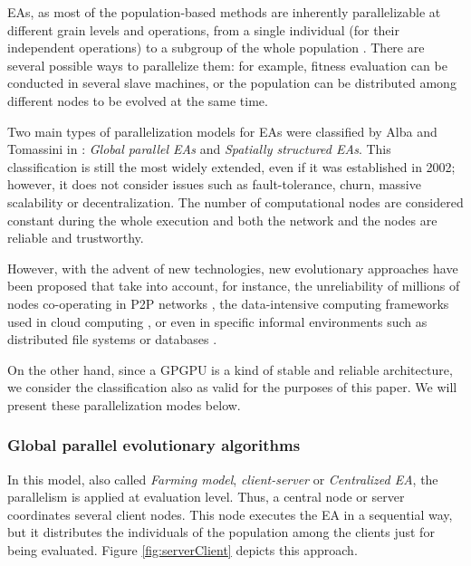 \documentclass{article}
\begin{document}
EAs, as most of the population-based methods are inherently parallelizable at different grain levels and operations, from a single individual (for their independent operations) to a subgroup of the whole population  \cite{Alba13parallel}.
There are several possible ways to parallelize them: for example, fitness evaluation can be conducted in several slave machines, or the population can be distributed among different nodes to be evolved at the same time.

Two main types of parallelization models for EAs were classified by Alba and Tomassini in \cite{Alba02Parallelism}: \textit{Global parallel EAs} and
\textit{Spatially structured EAs}. This classification is still the
most widely extended, even if it was established in 2002; however, it
does not consider issues such as fault-tolerance, churn, massive
scalability or decentralization. The number of computational nodes are
considered constant during the whole execution and both the network
and the nodes are reliable and trustworthy.

However, with the advent of new technologies, new evolutionary approaches have been proposed that take into account, for instance, the unreliability of millions of nodes co-operating in P2P networks \cite{laredo2010evag}, the data-intensive computing frameworks used in cloud computing \cite{VermaCloud10}, or even in specific informal environments such as distributed file systems or databases \cite{Meri_CloudEA13,Merelo_Couch13}.

On the other hand, since a GPGPU is a kind of
stable and reliable architecture, we consider the classification also
as valid for the purposes of this paper. We will present these
parallelization modes below.

\subsubsection{Global parallel evolutionary algorithms}
In this model, also called \textit{Farming model},
\textit{client-server} or \textit{Centralized EA}, the parallelism is
applied at evaluation level. Thus, a central node or server coordinates several
client nodes. This node executes the EA in a sequential way, but it
distributes the individuals of the population among the clients just
for being evaluated. Figure \ref{fig:serverClient} depicts this
approach.
\end{document}
